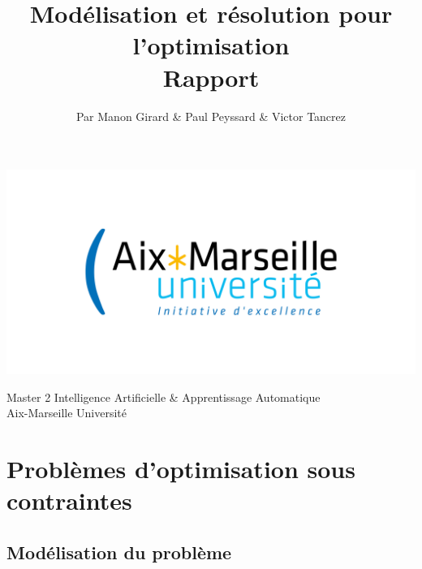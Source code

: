 \documentclass[a4paper, 10pt]{article}
\begin{document}
\setlength{\parindent}{0cm}
\setlength{\parskip}{1ex plus 0.5ex minus 0.2ex}
\newcommand{\hsp}{\hspace{20pt}}
\newcommand{\HRule}{\rule{\linewidth}{0.5mm}}

  \title{Modélisation et résolution pour l'optimisation \\ Rapport \\[1ex] \large }
  \author{Par Manon Girard \& Paul Peyssard \& Victor Tancrez}
  \date{}
  \maketitle

  \begin{center}
    \includegraphics[scale=0.2]{images/amu2.png}
  \end{center}

  \vfill
  \begin{center}
    Master 2 Intelligence Artificielle \& Apprentissage Automatique \\
    Aix-Marseille Université \\
  \end{center}
  \pagebreak

  \tableofcontents
  \newpage

  \section{Problèmes d'optimisation sous contraintes}

    \subsection{Modélisation du problème}
\end{document}
